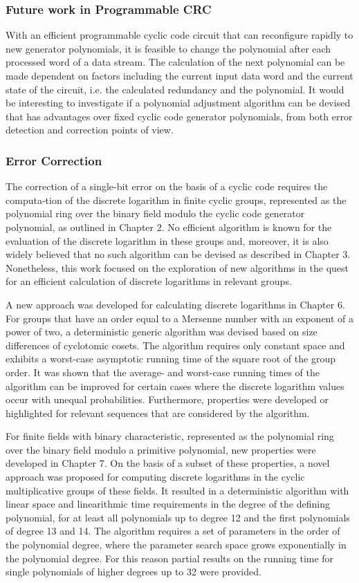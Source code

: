 \documentclass[a4paper, 11pt]{article}
\begin{document}
\subsubsection{Future work in Programmable CRC}
With an efficient programmable cyclic code circuit that can reconfigure rapidly to new generator polynomials, it is feasible to change the polynomial after each processed word of a data stream. The calculation of the next polynomial can be made dependent on factors including the current input data word and the current state of the circuit, i.e. the calculated redundancy and the polynomial. It would be interesting to investigate if a polynomial adjustment algorithm can be devised that has advantages over fixed cyclic code generator polynomials, from both error detection and correction points of view.

\subsubsection{Error Correction}
The correction of a single-bit error on the basis of a cyclic code requires the computa-tion of the discrete logarithm in finite cyclic groups, represented as the polynomial ring over the binary field modulo the cyclic code generator polynomial, as outlined in Chapter 2. No efficient algorithm is known for the evaluation of the discrete logarithm in these groups and, moreover, it is also widely believed that no such algorithm can be devised as described in Chapter 3. Nonetheless, this work focused on the exploration of new algorithms in the quest for an efficient calculation of discrete logarithms in relevant groups.

A new approach was developed for calculating discrete logarithms in Chapter 6. For groups that have an order equal to a Mersenne number with an exponent of a power of two, a deterministic generic algorithm was devised based on size differences of cyclotomic cosets. The algorithm requires only constant space and exhibits a worst-case asymptotic running time of the square root of the group order. It was shown that the average- and worst-case running times of the algorithm can be improved for certain cases where the discrete logarithm values occur with unequal probabilities. Furthermore, properties were developed or highlighted for relevant sequences that are considered by the algorithm.

For finite fields with binary characteristic, represented as the polynomial ring over the binary field modulo a primitive polynomial, new properties were developed in Chapter 7. On the basis of a subset of these properties, a novel approach was proposed for computing discrete logarithms in the cyclic multiplicative groups of these fields. It resulted in a deterministic algorithm with linear space and linearithmic time requirements in the degree of the defining polynomial, for at least all polynomials up to degree 12 and the first polynomials of degree 13 and 14. The algorithm requires a set of parameters in the order of the polynomial degree, where the parameter search space grows exponentially in the polynomial degree. For this reason partial results on the running time for single polynomials of higher degrees up to 32 were provided.
\end{document}
